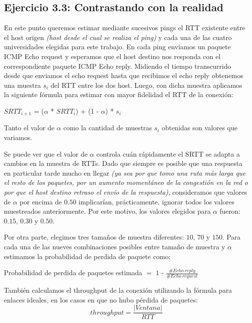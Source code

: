 \newpage
\subsection{Ejercicio 3.3: Contrastando con la realidad}

En este punto queremos estimar mediante sucesivos pings el RTT existente entre el host origen \textit{(host desde el cual se realiza el ping)} y cada una de las cuatro universidades elegidas para este trabajo.
En cada ping enviamos un paquete ICMP Echo request y esperamos que el host destino nos responda con el correspondiente paquete ICMP Echo reply. Midiendo el tiempo transcurrido desde que enviamos el echo request hasta que recibimos el echo reply obtenemos una muestra $s_i$ del RTT entre los dos host. Luego, con dicha muestra aplicamos la siguiente fórmula para estimar con mayor fidelidad el RTT de la conexión:
\begin{center}
  $SRTT_{i+1}$ = ($\alpha$ * $SRTT_i$) + (1 - $\alpha$) * $s_i$
\end{center}

Tanto el valor de $\alpha$ como la cantidad de muestras $s_i$ obtenidas son valores que variamos.


Se puede ver que el valor de $\alpha$ controla cuán rápidamente el SRTT se adapta a cambios en la muestra de RTTs. Dado que siempre es posible que una respuesta en particular tarde mucho en llegar \textit{(ya sea por que tomo una ruta más larga que el resto de los paquetes, por un aumento momentáneo de la congestión en la red o por que el host destino retraso el envío de la respuesta)}, consideramos que valores de $\alpha$ por encima de $0.50$ implicarían, prácticamente, ignorar todos los valores muestreados anteriormente. Por este motivo, los valores elegidos para $\alpha$ fueron: $0.15$, $0.30$ y $0.50$.


Por otra parte, elegimos tres tamaños de muestra diferentes: $10$, $70$ y $150$.
Para cada una de las nueves combinaciones posibles entre tamaño de muestra y $\alpha$ estimamos la probabilidad de perdida de paquete como:
\begin{center}
	Probabilidad de perdida de paquetes estimada $=$ $1$ - $\frac{\#Echo\ reply}{\#Echo\ request}$
\end{center}

También calculamos el throughput de la conexión utilizando la fórmula para enlaces ideales, en los casos en que no hubo pérdida de paquetes:
\begin{displaymath}
  throughput = \frac{|Ventana|}{RTT}
\end{displaymath}

